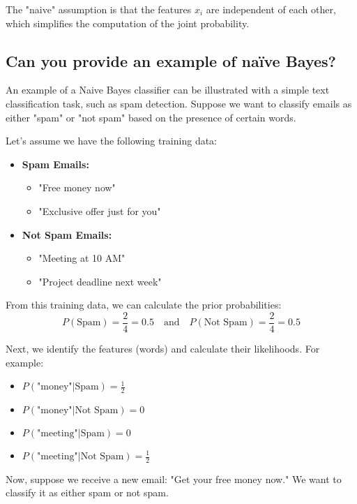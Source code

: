 The "naive" assumption is that the features \( x_i \) are independent of each other, which simplifies the computation of the joint probability.


\subsection{Can you provide an example of naïve Bayes?}

An example of a Naive Bayes classifier can be illustrated with a simple text classification task, such as spam detection. Suppose we want to classify emails as either "spam" or "not spam" based on the presence of certain words.

Let's assume we have the following training data:

\begin{itemize}
    \item \textbf{Spam Emails:} 
    \begin{itemize}
        \item "Free money now"
        \item "Exclusive offer just for you"
    \end{itemize}
    \item \textbf{Not Spam Emails:} 
    \begin{itemize}
        \item "Meeting at 10 AM"
        \item "Project deadline next week"
    \end{itemize}
\end{itemize}

From this training data, we can calculate the prior probabilities:
\[
P(\text{Spam}) = \frac{2}{4} = 0.5 \quad \text{and} \quad P(\text{Not Spam}) = \frac{2}{4} = 0.5
\]

Next, we identify the features (words) and calculate their likelihoods. For example:
\begin{itemize}
    \item \( P(\text{"money"} | \text{Spam}) = \frac{1}{2} \)
    \item \( P(\text{"money"} | \text{Not Spam}) = 0 \)
    \item \( P(\text{"meeting"} | \text{Spam}) = 0 \)
    \item \( P(\text{"meeting"} | \text{Not Spam}) = \frac{1}{2} \)
\end{itemize}

Now, suppose we receive a new email: "Get your free money now." We want to classify it as either spam or not spam.

